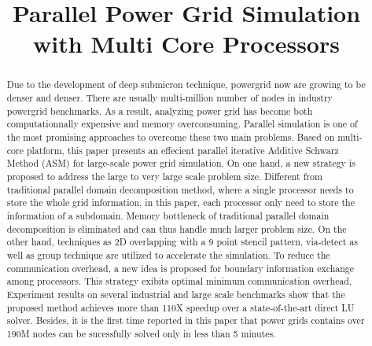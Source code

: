 \documentclass{sig-alternate}
\begin{document}
\title{Parallel Power Grid Simulation with Multi Core Processors}

\maketitle

\begin{abstract}
	Due to the development of deep submicron technique, powergrid now are growing to be denser and denser. There are usually 
	multi-million number of nodes in industry powergrid benchmarks. As a result, analyzing power grid has become both 
	computationnally expensive and memory 
	overconsuming. Parallel simulation is one of the most promising approaches to overcome these two main problems. Based on 
	multi-core platform, this paper presents an effecient parallel iterative Additive Schwarz Method (ASM) for large-scale 
	power grid simulation. On one hand, a new strategy is proposed to address the large to very large scale problem size. Different
	from traditional parallel domain decomposition method, where a single processor needs to store the whole grid information, 
	in this paper, each processor only need to store the information of a subdomain. Memory bottleneck of traditional parallel 
	domain decomposition is eliminated and can thus handle much larger problem size. 
	On the other hand, techniques as 2D overlapping with a 9 point stencil pattern, via-detect as well as group technique are  
	utilized to accelerate the simulation. To reduce the communication overhead, a new idea is 
	proposed for boundary information exchange among processors. This strategy exibits optimal minimum
	communication overhead. Experiment results on several industrial and large scale benchmarks show that the proposed method 
	achieves more than 110X speedup over a state-of-the-art direct LU solver. Besides, it is the first time 
	reported in this paper that power grids contains over 190M nodes can be sucessfully solved only in less than 5 minutes.
\end{abstract}
\end{document}
